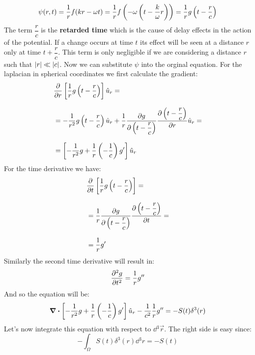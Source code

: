 \begin{equation}
  \psi(r,t) = \dfrac{1}{r} f(kr - \omega t) = \dfrac{1}{r} f\left(-\omega\left(t- \dfrac{k}{\omega}r\right)\right) = \dfrac{1}{r}g\left(t - \dfrac{r}{c}\right)
\end{equation}
The term $\dfrac{r}{c}$ is the \textbf{retarded time} which is the cause of delay effects in the action of the potential. If a change occurs at time $t$ its effect will be seen at a distance $r$ only at time $t + \dfrac{r}{c}$. This term is only negligible if we are considering a distance $r$ such that $\abs{r} \ll \abs{c}$.
Now we can substitute $\psi$ into the orginal equation. For the laplacian in spherical coordinates we first calculate the gradient:
\begin{equation}
  \begin{split}
    &\pdv{}{r}\sqbr{\dfrac{1}{r}g\brackets{t - \dfrac{r}{c}}}\hat{u}_r =\\[8pt]
    &= -\dfrac{1}{r^2}g\brackets{t - \dfrac{r}{c}}\hat{u}_r + \dfrac{1}{r}\pdv{g}{\brackets{t - \dfrac{r}{c}}}\pdv{\brackets{t - \dfrac{r}{c}}}{r}\hat{u}_r =\\[8pt]
    &= \sqbr{-\dfrac{1}{r^2}g + \dfrac{1}{r}\brackets{- \dfrac{1}{c}}g'}\hat{u}_r
  \end{split}
\end{equation}
For the time derivative we have:
\begin{equation}
  \begin{split}
    &\pdv{}{t}\sqbr{\dfrac{1}{r}g\brackets{t - \dfrac{r}{c}}} =\\[8pt]
    &= \dfrac{1}{r}\pdv{g}{\brackets{t - \dfrac{r}{c}}}\pdv{\brackets{t - \dfrac{r}{c}}}{t} =\\[8pt]
    &=\dfrac{1}{r}g'
  \end{split}
\end{equation}
Similarly the second time derivative will result in:
\begin{equation}
  \pdv[2]{g}{t} = \dfrac{1}{r}g''
\end{equation}
And so the equation will be:
\begin{equation}
  \div{\left[-\dfrac{1}{r^2}g + \dfrac{1}{r}\left(- \dfrac{1}{c}\right)g'\right]}\hat{u}_r - \dfrac{1}{c^2}\dfrac{1}{r}g'' = -S(t)\delta^3(r)
\end{equation}
Let's now integrate this equation with respect to $\dd{^3\vec{r}}$.
The right side is easy since:
\begin{equation}
  -\int_{\Omega} S(t)\delta^3(r) \dd{^3 r} = -S(t)
\end{equation}
